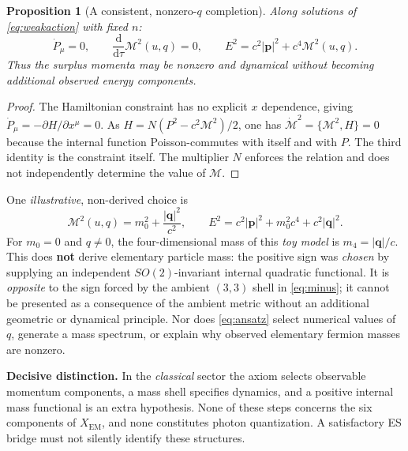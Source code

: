 \documentclass[10.5pt,a4paper]{article}
\newtheorem{proposition}{Proposition}[section]
\newcommand{\dd}{\mathrm d}
\newcommand{\mm}{\mathcal M}
\newcommand{\Xem}{X_{\mathrm{EM}}}
\newcommand{\st}[1]{\textcolor{muted}{\small\sffamily [#1]}}
\begin{document}
\begin{proposition}[A consistent, nonzero-$q$ completion]\label{prop:weak}
\st{Proved within the constructed model} Along solutions of \eqref{eq:weakaction} with fixed $n$:
\begin{equation}\label{eq:pres}
 \dot P_\mu=0,\qquad \frac{\dd}{\dd\tau}\mm^2(u,q)=0,\qquad
 \boxed{E^2=c^2|\mathbf p|^2+c^4\mm^2(u,q).}
\end{equation}
Thus the surplus momenta may be nonzero and dynamical without becoming additional observed energy components.
\end{proposition}
\begin{proof}
The Hamiltonian constraint has no explicit $x$ dependence, giving $\dot P_\mu=-\partial H/\partial x^\mu=0$. As $H=N(P^2-c^2\mm^2)/2$, one has $\dot{\mm}^2=\{\mm^2,H\}=0$ because the internal function Poisson-commutes with itself and with $P$. The third identity is the constraint itself. The multiplier $N$ enforces the relation and does not independently determine the value of $\mm$.
\end{proof}

One \emph{illustrative}, non-derived choice is
\begin{equation}\label{eq:ansatz}
 \mm^2(u,q)=m_0^2+\frac{|\mathbf q|^2}{c^2},\qquad
 E^2=c^2|\mathbf p|^2+m_0^2c^4+c^2|\mathbf q|^2.
\end{equation}
For $m_0=0$ and $q\ne0$, the four-dimensional mass of this \emph{toy model} is $m_{4}=|\mathbf q|/c$. This does \textbf{not} derive elementary particle mass: the positive sign was \emph{chosen} by supplying an independent $SO(2)$-invariant internal quadratic functional. It is \emph{opposite} to the sign forced by the ambient $(3,3)$ shell in \eqref{eq:minus}; it cannot be presented as a consequence of the ambient metric without an additional geometric or dynamical principle. Nor does \eqref{eq:ansatz} select numerical values of $q$, generate a mass spectrum, or explain why observed elementary fermion masses are nonzero.

\begin{resultbox}
\textbf{Decisive distinction.} In the \emph{classical} sector the axiom selects observable momentum components, a mass shell specifies dynamics, and a positive internal mass functional is an extra hypothesis. None of these steps concerns the six components of $\Xem$, and none constitutes photon quantization. A satisfactory ES bridge must not silently identify these structures.
\end{resultbox}
\end{document}
